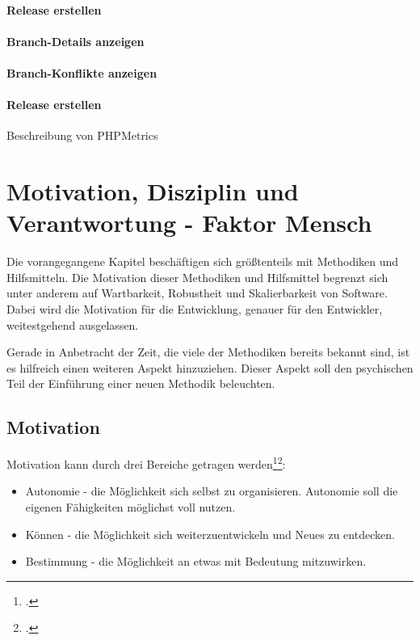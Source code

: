 \paragraph{Release erstellen}

\paragraph{Branch-Details anzeigen}

\paragraph{Branch-Konflikte anzeigen}

\paragraph{Release erstellen}

Beschreibung von PHPMetrics

\section{Motivation, Disziplin und Verantwortung - Faktor Mensch}
\label{sec:human-fail}
Die vorangegangene Kapitel beschäftigen sich größtenteils mit Methodiken und Hilfsmitteln. Die Motivation dieser Methodiken und Hilfsmittel begrenzt sich unter anderem auf Wartbarkeit, Robustheit und Skalierbarkeit von Software. Dabei wird die Motivation für die Entwicklung, genauer für den Entwickler, weitestgehend ausgelassen.

Gerade in Anbetracht der Zeit, die viele der Methodiken bereits bekannt sind, ist es hilfreich einen weiteren Aspekt hinzuziehen. Dieser Aspekt soll den psychischen Teil der Einführung einer neuen Methodik beleuchten.

\subsection{Motivation}

Motivation kann durch drei Bereiche getragen werden\footcite[vgl.][]{codingame-drive}\footcite[vgl.][Kap. Autonomie ff.]{pink-drive}:
\begin{itemize}
\item Autonomie - die Möglichkeit sich selbst zu organisieren. Autonomie soll die eigenen Fähigkeiten möglichst voll nutzen.
\item Können - die Möglichkeit sich weiterzuentwickeln und Neues zu entdecken.
\item Bestimmung - die Möglichkeit an etwas mit Bedeutung mitzuwirken.
\end{itemize}

